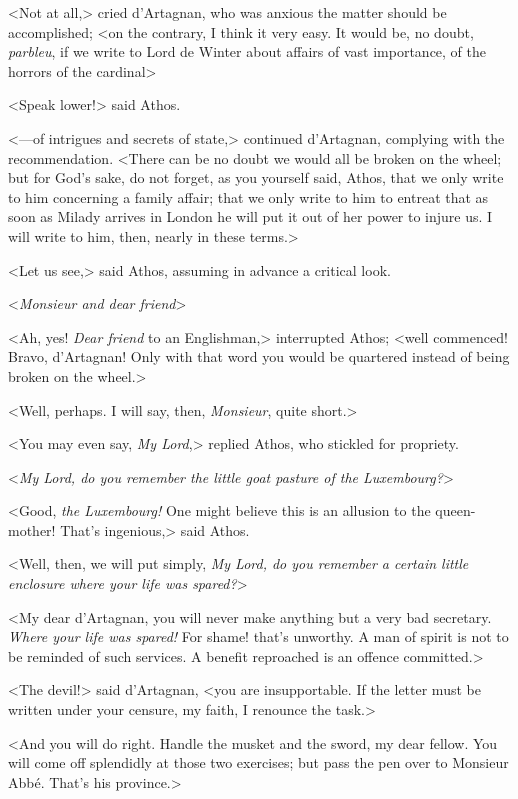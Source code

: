 <Not at all,> cried d'Artagnan, who was anxious the matter should be accomplished; <on the contrary, I think it very easy. It would be, no doubt, \textit{parbleu}, if we write to Lord de Winter about affairs of vast importance, of the horrors of the cardinal\longdash> 

<Speak lower!> said Athos. 

<---of intrigues and secrets of state,> continued d'Artagnan, complying with the recommendation. <There can be no doubt we would all be broken on the wheel; but for God's sake, do not forget, as you yourself said, Athos, that we only write to him concerning a family affair; that we only write to him to entreat that as soon as Milady arrives in London he will put it out of her power to injure us. I will write to him, then, nearly in these terms.> 

<Let us see,> said Athos, assuming in advance a critical look. 

<\textit{Monsieur and dear friend}\longdash> 

<Ah, yes! \textit{Dear friend} to an Englishman,> interrupted Athos; <well commenced! Bravo, d'Artagnan! Only with that word you would be quartered instead of being broken on the wheel.> 

<Well, perhaps. I will say, then, \textit{Monsieur}, quite short.> 

<You may even say, \textit{My Lord},> replied Athos, who stickled for propriety. 

<\textit{My Lord, do you remember the little goat pasture of the Luxembourg?}> 

<Good, \textit{the Luxembourg!} One might believe this is an allusion to the queen-mother! That's ingenious,> said Athos. 

<Well, then, we will put simply, \textit{My Lord, do you remember a certain little enclosure where your life was spared?}>

<My dear d'Artagnan, you will never make anything but a very bad secretary. \textit{Where your life was spared!} For shame! that's unworthy. A man of spirit is not to be reminded of such services. A benefit reproached is an offence committed.> 

<The devil!> said d'Artagnan, <you are insupportable. If the letter must be written under your censure, my faith, I renounce the task.> 

<And you will do right. Handle the musket and the sword, my dear fellow. You will come off splendidly at those two exercises; but pass the pen over to Monsieur Abbé. That's his province.> 

